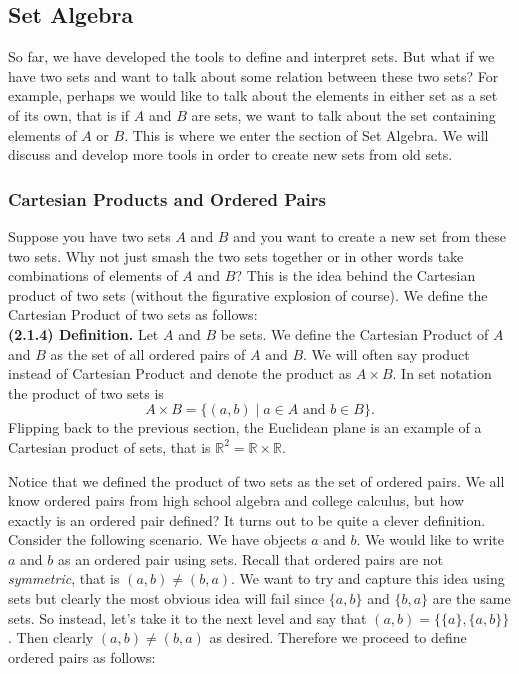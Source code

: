 \documentclass[12pt]{book}
\def\R{{\mathbb{R}}}
\begin{document}
\subsection*{Set Algebra}

	So far, we have developed the tools to define and interpret sets. But what if we have two sets and want to talk about some relation between these two sets? For example, perhaps we would like to talk about the elements in either set as a set of its own, that is if $A$ and $B$ are sets, we want to talk about the set containing elements of $A$ or $B$. This is where we enter the section of Set Algebra. We will discuss and develop more tools in order to create new sets from old sets.

\subsubsection{Cartesian Products and Ordered Pairs}

Suppose you have two sets $A$ and $B$ and you want to create a new set from these two sets. Why not just smash the two sets together or in other words take combinations of elements of $A$ and $B$? This is the idea behind the Cartesian product of two sets (without the figurative explosion of course). We define the Cartesian Product of two sets as follows:\\

\noindent\textbf{(2.1.4) Definition.} Let $A$ and $B$ be sets. We define the Cartesian Product of $A$ and $B$ as the set of all ordered pairs of $A$ and $B$. We will often say product instead of Cartesian Product and denote the product as $A\times B$. In set notation the product of two sets is
\[A\times B=\{(a,b)\mid a\in A\text{ and } b\in B\}.\]
Flipping back to the previous section, the Euclidean plane is an example of a Cartesian product of sets, that is $\R^2=\R\times\R$. 

Notice that we defined the product of two sets as the set of ordered pairs. We all know ordered pairs from high school algebra and college calculus, but how exactly is an ordered pair defined? It turns out to be quite a clever definition. Consider the following scenario. We have objects $a$ and $b$. We would like to write $a$ and $b$ as an ordered pair using sets. Recall that ordered pairs are not \textit{symmetric}, that is $(a,b)\neq (b,a)$. We want to try and capture this idea using sets but clearly the most obvious idea will fail since $\{a,b\}$ and $\{b,a\}$ are the same sets. So instead, let's take it to the next level and say that $(a,b)=\{\{a\},\{a,b\}\}$. Then clearly $(a,b)\neq (b,a)$ as desired. Therefore we proceed to define ordered pairs as follows:\\
\end{document}
